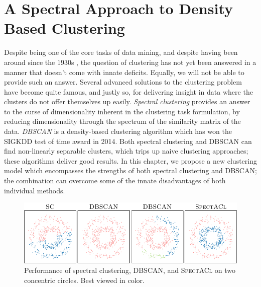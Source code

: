 \chapter{A Spectral Approach to Density Based Clustering}
\label{chap:Spectacl}
Despite being one of the core tasks of data mining, and despite having been around since the $1930$s \citep{driver1932quantitative,klimek1935culture,tryon1939cluster}, the question of clustering has not yet been answered in a
manner that doesn't come with innate deficits. Equally, we will not be able to provide such an answer. Several advanced solutions to the clustering problem have become quite famous, and justly so, for delivering insight in data where the clusters do not offer themselves up easily.  \emph{Spectral clustering} provides an answer to the curse of dimensionality
inherent in the clustering task formulation, by reducing dimensionality through the spectrum of the
similarity matrix of the data.  \emph{DBSCAN} \citep{ester1996density} is a density-based clustering algorithm 
which has won the SIGKDD test of time award in 2014.  Both spectral clustering and DBSCAN can find 
non-linearly separable clusters, which trips up naive clustering approaches; these algorithms deliver 
good results. In this chapter, we propose a new clustering model which encompasses the strengths of both 
spectral clustering and DBSCAN; the combination can overcome some of the innate disadvantages of both 
individual methods.
\begin{figure}[t]
\centering
\includegraphics[width=\linewidth]{pics/SAIntroCircles.pdf}
%
\caption{Performance of spectral clustering, DBSCAN, and \textsc{SpectACl} on two concentric circles. Best viewed in color.}
\label{fig:intro}
\end{figure}

